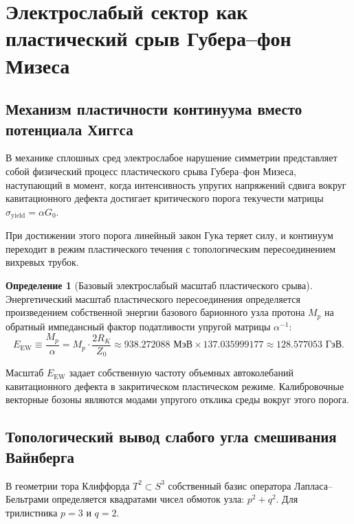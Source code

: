 \documentclass[11pt,a4paper]{article}
\theoremstyle{definition}
\newtheorem{definition}{Определение}
\theoremstyle{remark}
\begin{document}
\section{Электрослабый сектор как пластический срыв Губера--фон Мизеса}
	
\subsection{Механизм пластичности континуума вместо потенциала Хиггса}
	
В механике сплошных сред электрослабое нарушение симметрии представляет собой физический процесс пластического срыва Губера--фон Мизеса, наступающий в момент, когда интенсивность упругих напряжений сдвига вокруг кавитационного дефекта достигает критического порога текучести матрицы $\sigma_{\mathrm{yield}} = \alpha G_0$.
	
При достижении этого порога линейный закон Гука теряет силу, и континуум переходит в режим пластического течения с топологическим пересоединением вихревых трубок.
	
\begin{definition}[Базовый электрослабый масштаб пластического срыва]
Энергетический масштаб пластического пересоединения определяется произведением собственной энергии базового барионного узла протона $M_p$ на обратный импедансный фактор податливости упругой матрицы $\alpha^{-1}$:
\begin{equation}
	E_{\mathrm{EW}} \equiv \frac{M_p}{\alpha} = M_p \cdot \frac{2 R_K}{Z_0} \approx 938.272088\text{ МэВ} \times 137.035999177 \approx 128.577053\text{ ГэВ}.
\label{eq:electroweak_scale_exact}
\end{equation}
\end{definition}
	
Масштаб $E_{\mathrm{EW}}$ задает собственную частоту объемных автоколебаний кавитационного дефекта в закритическом пластическом режиме. Калибровочные векторные бозоны являются модами упругого отклика среды вокруг этого порога.
	
\subsection{Топологический вывод слабого угла смешивания Вайнберга}
	
В геометрии тора Клиффорда $T^2 \subset S^3$ собственный базис оператора Лапласа--Бельтрами определяется квадратами чисел обмоток узла: $p^2 + q^2$. Для трилистника $p=3$ и $q=2$.
	
\end{document}
